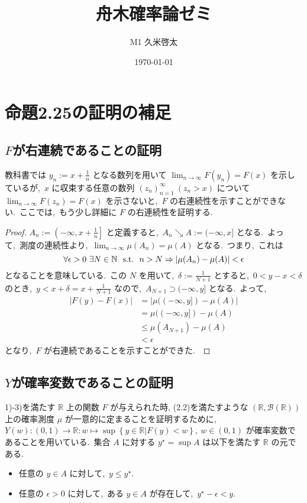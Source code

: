 \documentclass[a4j,11pt]{jarticle}
\title{舟木確率論ゼミ}
\author{M1 久米啓太}
\date{\today}
\theoremstyle{definition}
\begin{document}
\maketitle


\section{命題2.25の証明の補足}
\subsection*{$F$が右連続であることの証明}
教科書では
$y_n:=x+\frac{1}{n}$
となる数列を用いて
$\lim_{n\to\infty}F(y_n) = F(x)$
を示しているが,\ 
$x$
に収束する任意の数列
$(z_n)_{n=1}^{\infty}\ (z_n>x)$
について
$\lim_{n\to\infty}F(z_n) = F(x)$
を示さないと,\ 
$F$
の右連続性を示すことができない.\ 
ここでは,\ もう少し詳細に
$F$
の右連続性を証明する.\ 

\begin{proof}
  $A_n:=\left( -\infty, x+\frac{1}{n}\right]$
  と定義すると,\ 
  $A_n \searrow A :=(-\infty, x]$
  となる.\ 
  よって,\ 測度の連続性より,\ 
  $\lim_{n\to\infty}\mu(A_n) = \mu(A)$
  となる.\ 
  つまり,\ これは
  \begin{equation}
    \forall \epsilon > 0 \ \exists N \in \mathbb{N} \ \ {\rm s.t.}\ \ n > N \Rightarrow |\mu(A_n) - \mu(A)| < \epsilon
  \end{equation}
  となることを意味している.\ 
  この
  $N$
  を用いて,\ 
  $\delta := \frac{1}{N+1}$
  とすると,\ 
  $0<y-x<\delta$
  のとき,\ 
  $y < x + \delta = x + \frac{1}{N+1}$
  なので,\ 
  $A_{N+1} \supset (-\infty,y]$
  となる.\ 
  よって,\ 
  \begin{align}
    |F(y)-F(x)|
    & = |\mu((-\infty,y]) - \mu(A)| \\
    & = \mu((-\infty,y]) - \mu(A) \\
    & \leq \mu(A_{N+1}) - \mu(A) \\
    & < \epsilon
  \end{align}
  となり,\ 
  $F$
  が右連続であることを示すことができた.\ 
\end{proof}
\subsection*{$Y$が確率変数であることの証明}
1)-3)を満たす
$\mathbb{R}$
上の関数
$F$
が与えられた時, (2.2)を満たすような
$(\mathbb{R},\mathcal{B}(\mathbb{R}))$
上の確率測度
$\mu$
が一意的に定まることを証明するために,\  
$Y(w):\left( 0,1\right)\to \mathbb{R}:w\mapsto \sup \left\{y \in \mathbb{R} | F(y) < w \right\}, \ w \in \left(0,1 \right)$
が確率変数であることを用いている.\ 
集合
$A$
に対する
$y^\star = \sup A$
は以下を満たす
$\mathbb{R}$
の元である.\ 
\begin{itemize}
  \item 
    任意の
    $y \in A$
    に対して,\ 
    $y \leq y^\star$.
  \item
    任意の
    $\epsilon > 0$
    に対して,\ ある
    $y \in A$
    が存在して,\ 
    $y^\star - \epsilon < y$.
\end{itemize}
\end{document}

